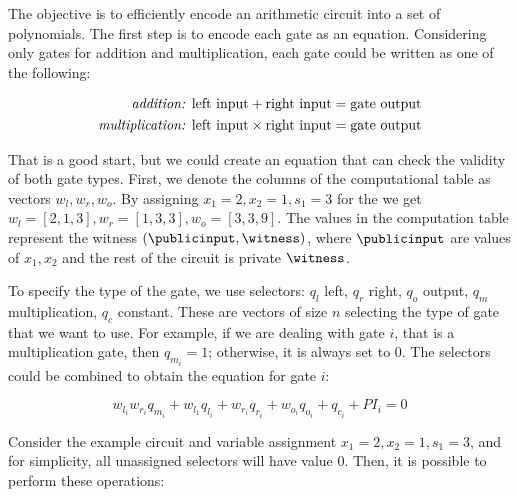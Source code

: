 The objective is to efficiently encode an arithmetic circuit into a set of polynomials. The first step is to encode each gate as an equation. Considering only gates for addition and multiplication, each gate could be written as one of the following:

\begin{align}
    \label{eq:primitive_gate_constraints}
    \text{\textit{addition:} } \text{left input} + \text{right input} = \text{gate output} 
    \\
    \text{\textit{multiplication:} } \text{left input} \times \text{right input} = \text{gate output}
\end{align}

That is a good start, but we could create an equation that can check the validity of both gate types. First, we denote the columns of the computational table as vectors $w_l, w_r, w_o$. By assigning $x_1 = 2, x_2 = 1, s_1 = 3$ for the  we get $w_l = [2, 1, 3], w_r = [1, 3, 3], w_o = [3, 3, 9]$. The values in the computation table represent the witness $(\publicinput, \witness)$, where $\publicinput$ are values of $x_1, x_2$ and the rest of the circuit is private $\witness$. 

To specify the type of the gate, we use selectors: $q_l$ left, $q_r$ right, $q_o$ output, $q_m$ multiplication, $q_c$ constant. These are vectors of size $n$ selecting the type of gate that we want to use. For example, if we are dealing with gate $i$, that is a multiplication gate, then $q_{m_i} = 1$; otherwise, it is always set to 0. The selectors could be combined to obtain the equation for gate $i$:

\begin{equation}
    \label{gate-constraint}
    w_{l_i}w_{r_i}q_{m_i} + w_{l_1}q_{l_i} + w_{r_i}q_{r_i} + w_{o_i}q_{o_i} + q_{c_i} + PI_i = 0
\end{equation}

Consider the example circuit and variable assignment $x_1 = 2, x_2 = 1, s_1 = 3$, and for simplicity, all unassigned selectors will have value 0. Then, it is possible to perform these operations:

